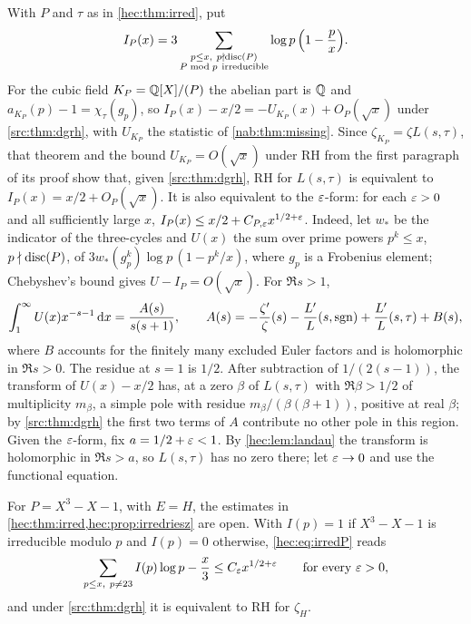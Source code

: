 \begin{remark}\label{hec:prop:irredriesz}
With $P$ and $\tau$ as in \cref{hec:thm:irred}, put
\[
 I_P(x)=3\sum_{\substack{p\le x,\ p\nmid\operatorname{disc}(P)\\ P\bmod p\ \mathrm{irreducible}}}
 \log p\,\Bigl(1-\frac px\Bigr).
\]
For the cubic field $K_P=\mathbb{Q}[X]/(P)$ the abelian part is $\mathbb{Q}$ and $a_{K_P}(p)-1=\chi_\tau(g_p)$, so
$I_P(x)-x/2=-U_{K_P}(x)+O_P(\sqrt x)$ under \cref{src:thm:dgrh}, with $U_{K_P}$ the statistic of
\cref{nab:thm:missing}. Since $\zeta_{K_P}=\zeta L(s,\tau)$, that theorem and the bound $U_{K_P}=O(\sqrt x)$
under RH from the first paragraph of its proof show that, given \cref{src:thm:dgrh}, RH for $L(s,\tau)$
is equivalent to $I_P(x)=x/2+O_P(\sqrt x)$. It is also equivalent to the $\varepsilon$-form: for each $\varepsilon>0$
and all sufficiently large $x$, $I_P(x)\le x/2+C_{P,\varepsilon}x^{1/2+\varepsilon}$. Indeed, let $w_*$ be the indicator
of the three-cycles and $U(x)$ the sum over prime powers $p^k\le x$, $p\nmid\operatorname{disc}(P)$, of
$3w_*(g_p^k)\log p\,(1-p^k/x)$, where $g_p$ is a Frobenius element; Chebyshev's bound gives
$U-I_P=O(\sqrt x)$. For $\Re s>1$,
\[
 \int_1^\infty U(x)x^{-s-1}\,\mathrm{d} x=\frac{A(s)}{s(s+1)},\qquad
 A(s)=-\frac{\zeta'}{\zeta}(s)-\frac{L'}L(s,\operatorname{sgn})+\frac{L'}L(s,\tau)+B(s),
\]
where $B$ accounts for the finitely many excluded Euler factors and is holomorphic in $\Re s>0$. The
residue at $s=1$ is $1/2$. After subtraction of $1/(2(s-1))$, the transform of $U(x)-x/2$ has, at a zero
$\beta$ of $L(s,\tau)$ with $\Re\beta>1/2$ of multiplicity $m_\beta$, a simple pole with residue
$m_\beta/(\beta(\beta+1))$, positive at real $\beta$; by \cref{src:thm:dgrh} the first two terms of $A$
contribute no other pole in this region. Given the $\varepsilon$-form, fix $a=1/2+\varepsilon<1$. By
\cref{hec:lem:landau} the transform is holomorphic in $\Re s>a$, so $L(s,\tau)$ has no zero there; let
$\varepsilon\to0$ and use the functional equation.
\end{remark}

For $P=X^3-X-1$, with $E=H$, the estimates in \cref{hec:thm:irred,hec:prop:irredriesz} are open. With
$I(p)=1$ if $X^3-X-1$ is irreducible modulo $p$ and $I(p)=0$ otherwise, \eqref{hec:eq:irredP} reads
\begin{equation}\label{hec:eq:irred23}
 \sum_{p\le x,\ p\ne23}I(p)\log p-\frac x3\le C_\varepsilon x^{1/2+\varepsilon}\qquad\text{for every }\varepsilon>0 ,
\end{equation}
and under \cref{src:thm:dgrh} it is equivalent to RH for $\zeta_H$.

